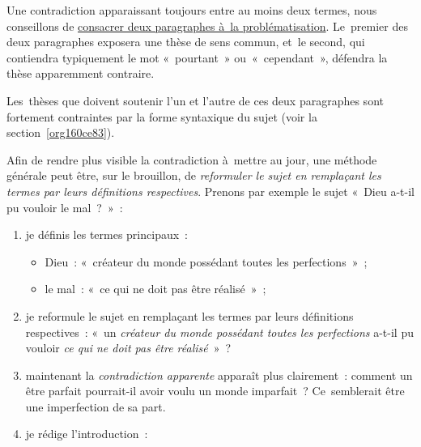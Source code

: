 \documentclass[a4paper,12pt]{report}
\begin{document}
Une contradiction apparaissant toujours entre au moins deux termes, nous
conseillons de \uline{consacrer deux paragraphes à la problématisation}.
Le premier des deux paragraphes exposera une thèse de sens commun, et le
second, qui contiendra typiquement le mot « pourtant » ou « cependant »,
défendra la thèse apparemment contraire.

Les thèses que doivent soutenir l'un et l'autre de ces deux paragraphes
sont fortement contraintes par la forme syntaxique du sujet (voir la
section \ref{org160ce83}).

Afin de rendre plus visible la contradiction à mettre au jour, une
méthode générale peut être, sur le brouillon, de \emph{reformuler le sujet en
remplaçant les termes par leurs définitions respectives}. Prenons par
exemple le sujet « Dieu a-t-il pu vouloir le mal ? » :

\begin{enumerate}
\item je définis les termes principaux :
\begin{itemize}
\item Dieu : « créateur du monde possédant toutes les perfections » ;
\item le mal : « ce qui ne doit pas être réalisé » ;
\end{itemize}

\item je reformule le sujet en remplaçant les termes par leurs définitions
respectives : « un \emph{créateur du monde possédant toutes les
perfections} a-t-il pu vouloir \emph{ce qui ne doit pas être réalisé} » ?

\item maintenant la \emph{contradiction apparente} apparaît plus clairement :
comment un être parfait pourrait-il avoir voulu un monde imparfait ?
Ce semblerait être une imperfection de sa part.

\item je rédige l'introduction :
\end{enumerate}
\end{document}
